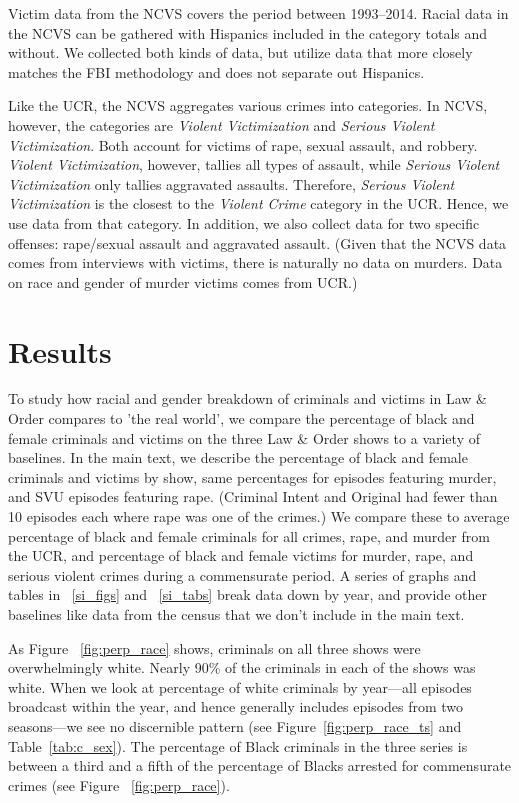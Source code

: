 \documentclass[12pt, letterpaper]{article}
\begin{document}
Victim data from the NCVS covers the period between 1993--2014. Racial data in the NCVS can be gathered with Hispanics included in the category totals and without. We collected both kinds of data, but utilize data that more closely matches the FBI methodology and does not separate out Hispanics.

Like the UCR, the NCVS aggregates various crimes into categories. In NCVS, however, the categories are \textit{Violent Victimization} and \textit{Serious Violent Victimization}. Both account for victims of rape, sexual assault, and robbery. \textit{Violent Victimization}, however, tallies all types of assault, while \textit{Serious Violent Victimization} only tallies aggravated assaults. Therefore, \textit{Serious Violent Victimization} is the closest to the \textit{Violent Crime} category in the UCR. Hence, we use data from that category. In addition, we also collect data for two specific offenses: rape/sexual assault and aggravated assault. (Given that the NCVS data comes from interviews with victims, there is naturally no data on murders. Data on race and gender of murder victims comes from UCR.)

\section*{Results}
To study how racial and gender breakdown of criminals and victims in Law \& Order compares to 'the real world', we compare the percentage of black and female criminals and victims on the three Law \& Order shows to a variety of baselines. In the main text, we describe the percentage of black and female criminals and victims by show, same percentages for episodes featuring murder, and SVU episodes featuring rape. (Criminal Intent and Original had fewer than 10 episodes each where rape was one of the crimes.) We compare these to average percentage of black and female criminals for all crimes, rape, and murder from the UCR, and percentage of black and female victims for murder, rape, and serious violent crimes during a commensurate period. A series of graphs and tables in ~\ref{si_figs} and ~\ref{si_tabs} break data down by year, and provide other baselines like data from the census that we don't include in the main text.

As Figure ~\ref{fig:perp_race} shows, criminals on all three shows were overwhelmingly white. Nearly 90\% of the criminals in each of the shows was white. When we look at percentage of white criminals by year---all episodes broadcast within the year, and hence generally includes episodes from two seasons---we see no discernible pattern (see Figure~\ref{fig:perp_race_ts} and Table~\ref{tab:c_sex}). The percentage of Black criminals in the three series is between a third and a fifth of the percentage of Blacks arrested for commensurate crimes (see Figure ~\ref{fig:perp_race}). 
\end{document}
